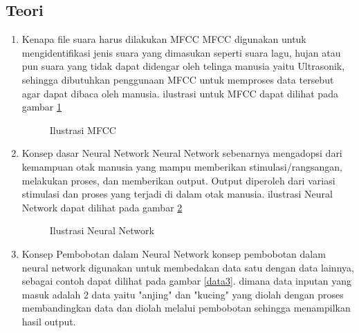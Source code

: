 \subsection{Teori}
\begin{enumerate}
\item Kenapa file suara harus dilakukan MFCC
\subitem MFCC digunakan untuk mengidentifikasi jenis suara yang dimasukan seperti suara lagu, hujan atau pun suara yang tidak dapat didengar oleh telinga manusia yaitu Ultrasonik, sehingga dibutuhkan penggunaan MFCC untuk memproses data tersebut agar dapat dibaca oleh manusia. ilustrasi untuk MFCC dapat dilihat pada gambar \ref{data1}

\begin{figure}[!htbp]
      \caption{Ilustrasi MFCC}
      \label{data1}
\end{figure}

\item Konsep dasar Neural Network
\subitem Neural Network sebenarnya mengadopsi dari kemampuan otak manusia yang mampu memberikan stimulasi/rangsangan, melakukan proses, dan memberikan output. Output diperoleh dari variasi stimulasi dan proses yang terjadi di dalam otak manusia.
ilustrasi Neural Network dapat dilihat pada gambar \ref{data2}

\begin{figure}[!htbp]
      \caption{Ilustrasi Neural Network}
      \label{data2}
\end{figure}

\item Konsep Pembobotan dalam Neural Network
\subitem konsep pembobotan dalam neural network digunakan untuk membedakan data satu dengan data lainnya, sebagai contoh dapat dilihat pada gambar \ref{data3}. dimana data inputan yang masuk adalah 2 data yaitu "anjing" dan "kucing" yang diolah dengan proses membandingkan data dan diolah melalui pembobotan sehingga menampilkan hasil output.


\end{enumerate}
